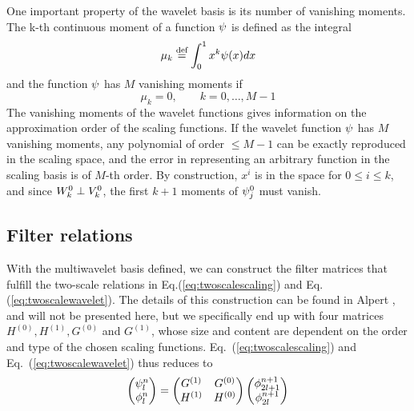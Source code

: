 One important property of the wavelet basis is its number of vanishing moments. 
The k-th continuous moment of a function $\psi$ is defined as the integral
\begin{equation}
	\mu_k \stackrel{\text{def}}{\hbox{=}} \int_0^1 x^k\psi(x)dx 	
\end{equation}
and the function $\psi$ has $M$ vanishing moments if \[\mu_k = 0,\qquad k=0,\dots, M-1 \]
The vanishing moments of the wavelet functions gives information on the
approximation order of the scaling functions. If the wavelet function
$\psi$ has $M$ vanishing moments, any polynomial of order $\leq M-1$ can be 
exactly reproduced in the scaling space, and the error in
representing an arbitrary function in the scaling basis is of $M$-th order. 
By construction, $x^i$ is in the space  for $0\leq i \leq k$, and since
${W}_{k}^{0} \perp {V}_{k}^{0}$, the first $k+1$ moments of $\psi^0_j$ must vanish.

\subsection{Filter relations}
With the multiwavelet basis defined, we can construct the filter
matrices that fulfill the two-scale relations in Eq.(\ref{eq:twoscalescaling}) and
Eq.(\ref{eq:twoscalewavelet}). The details of this construction can be found in
Alpert \etal\cite{Alpert02}, and will not be presented here, but we specifically 
end up with four matrices $H^{(0)}, H^{(1)}, G^{(0)}$ and $G^{(1)}$, whose size and 
content are dependent on the order and type of the chosen scaling functions. 
Eq.~(\ref{eq:twoscalescaling}) and Eq.~(\ref{eq:twoscalewavelet}) thus reduces to
\begin{equation}
    \label{eq:twoscalerelations}
    \begin{pmatrix}
	\psi_{l}^{n}\\
	\phi_{l}^{n}\\
    \end{pmatrix}=
    \begin{pmatrix}
	G^{(1)}&G^{(0)}\\
	H^{(1)}&H^{(0)}\\
    \end{pmatrix}
    \begin{pmatrix}
	\phi_{2l+1}^{n+1}\\
	\phi_{2l}^{n+1}\\
    \end{pmatrix}
\end{equation}


